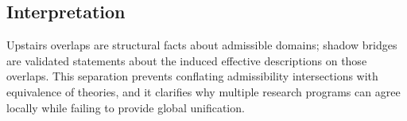 \documentclass[11pt]{article}
\begin{document}
\subsection{Interpretation}
Upstairs overlaps are structural facts about admissible domains; shadow bridges are validated statements about the induced effective
descriptions on those overlaps. This separation prevents conflating admissibility intersections with equivalence of theories, and it clarifies
why multiple research programs can agree locally while failing to provide global unification.


\end{document}
